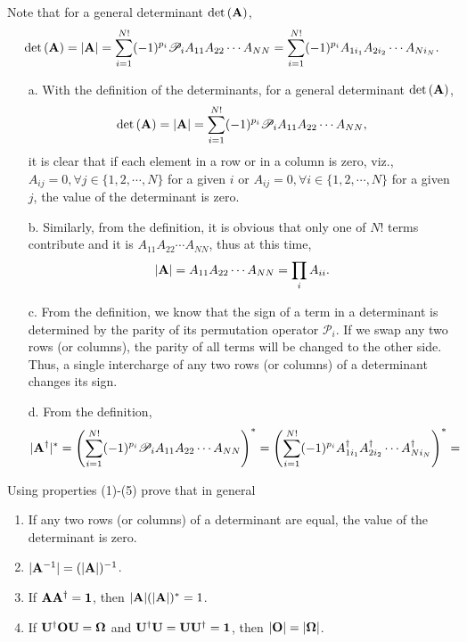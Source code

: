 \documentclass[a4paper]{book}
\renewcommand\det[1]{\mathrm{det\left(#1\right)}}
\newcommand{\A}{{\bf A}}
\newcommand{\U}{{\bf U}}
\newcommand{\Op}{{\bf O}}
\begin{document}
	\begin{solution}
	
	Note that for a general determinant $\det{\A}$,
	\[
		\det{\A} = | \A | = \sum_{i=1}^{N!} (-1)^{p_i} \mathscr{P}_i A_{11} A_{22} \cdots A_{NN} = \sum_{i=1}^{N!} (-1)^{p_i} A_{1 i_1} A_{2 i_2} \cdots A_{N i_N}. 
	\]
	
	\begin{enumerate}
	
	\item[a.] With the definition of the determinants, for a general determinant $\det{\A}$,
	\[
		\det{\A} = | \A | = \sum_{i=1}^{N!} (-1)^{p_i} \mathscr{P}_i A_{11} A_{22} \cdots A_{NN},
	\]
	it is clear that if each element in a row or in a column is zero, viz., $A_{ij} = 0, \forall j \in \{1,2,\cdots,N\}$ for a given $i$ or $A_{ij} = 0, \forall i \in \{1,2,\cdots,N\}$ for a given $j$, the value of the determinant is zero.
	
	\item[b.] Similarly, from the definition, it is obvious that only one of $N!$ terms contribute and it is $A_{11} A_{22} \cdots A_{NN}$, thus at this time,
	\[
		| \A | = A_{11} A_{22} \cdots A_{NN} = \prod_i A_{ii}.
	\]
	
	\item[c.] From the definition, we know that the sign of a term in a determinant is determined by the parity of its permutation operator $\mathscr{P}_i$. If we swap any two rows (or columns), the parity of all terms will be changed to the other side. Thus, a single intercharge of any two rows (or columns) of a determinant changes its sign.
	
	\item[d.] From the definition,
	\[
		| \A^\dagger |^* = \left( \sum_{i=1}^{N!} (-1)^{p_i} \mathscr{P}_i A_{11} A_{22} \cdots A_{NN} \right)^* = \left( \sum_{i=1}^{N!} (-1)^{p_i} A^\dagger_{1 i_1} A^\dagger_{2 i_2} \cdots A^\dagger_{N i_N} \right)^* = 
	\]	
	
	\end{enumerate}		
	
	\end{solution}
	
	\begin{exercise}
	Using properties (1)-(5) prove that in general
	\begin{enumerate}

	\item If any two rows (or columns) of a determinant are equal, the value of the determinant is zero.
	
	\item $|\A^{-1}|=(|\A|)^{-1}$.
	
	\item If $\A \A^\dagger = \bf{1}$, then $|\A|(|\A|)^* = 1$.
	
	\item If $\U^\dagger \Op \U = \bf{\Omega}$ and $\U^\dagger \U = \U \U^\dagger = \bf{1}$, then $|\Op|=|\bf{\Omega}|$.

	\end{enumerate}		
	\end{exercise}
	
\end{document}
